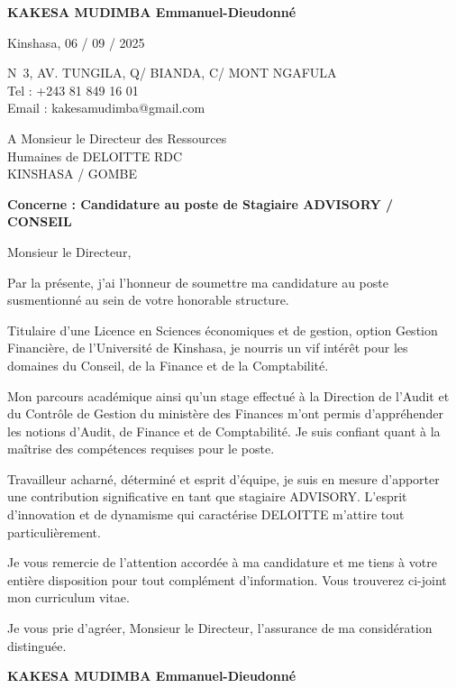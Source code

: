 \documentclass[11pt,a4paper]{article}
\makeatletter
\newcommand{\NomExp}{KAKESA MUDIMBA Emmanuel-Dieudonn\'e}
\newcommand{\AdrExp}{N\textdegree\ 3, AV. TUNGILA, Q/ BIANDA, C/ MONT NGAFULA}
\newcommand{\TelExp}{Tel : +243 81 849 16 01}
\newcommand{\MailExp}{Email : kakesamudimba@gmail.com}
\newcommand{\DateLieu}{Kinshasa, 06 / 09 / 2025}
\newcommand{\DestLigneA}{A Monsieur le Directeur des Ressources}
\newcommand{\DestLigneB}{Humaines de DELOITTE RDC}
\newcommand{\DestLigneC}{KINSHASA / GOMBE}
\newcommand{\Salut}{Monsieur le Directeur,}
\newcommand{\Objet}{Candidature au poste de Stagiaire ADVISORY / CONSEIL}
\newcommand{\Corps}{%
Par la présente, j'ai l'honneur de soumettre ma candidature au poste
susmentionné au sein de votre honorable structure.

Titulaire d'une Licence en Sciences économiques et de gestion, option
Gestion Financière, de l'Université de Kinshasa, je nourris un vif
intérêt pour les domaines du Conseil, de la Finance et de la Comptabilité.

Mon parcours académique ainsi qu'un stage effectué à la Direction de
l'Audit et du Contrôle de Gestion du ministère des Finances m'ont permis
d'appréhender les notions d'Audit, de Finance et de Comptabilité. Je suis
confiant quant à la maîtrise des compétences requises pour le poste.

Travailleur acharné, déterminé et esprit d'équipe, je suis en mesure
d'apporter une contribution significative en tant que stagiaire ADVISORY.
L'esprit d'innovation et de dynamisme qui caractérise DELOITTE m'attire
tout particulièrement.

Je vous remercie de l'attention accordée à ma candidature et me tiens à
votre entière disposition pour tout complément d'information. Vous trouverez
ci-joint mon curriculum vitae.
}
\newcommand{\Formule}{Je vous prie d'agréer, Monsieur le Directeur, l'assurance de ma considération distinguée.}
\makeatother
\begin{document}
\noindent
\begin{minipage}[t]{0.48\textwidth}
  {\color{navy}\textbf{\NomExp}}
\end{minipage}
\hfill
\begin{minipage}[t]{0.48\textwidth}
  \raggedleft
  \DateLieu
\end{minipage}

\noindent
\begin{minipage}[t]{0.48\textwidth}
  \AdrExp\\
  \TelExp\\
  \MailExp
\end{minipage}

\vspace{0.6cm}

\hfill
\begin{minipage}[t]{0.48\textwidth}
  \DestLigneA\\
  \DestLigneB\\
  \DestLigneC
\end{minipage}

\vspace{1.2cm}

{\color{navy}\textbf{Concerne : \Objet}}

\vspace{0.4cm}
\Salut

\vspace{0.3cm}

\Corps

\vspace{0.6cm}
\Formule

\vspace{1.4cm}
\raggedleft
{\color{navy}\textbf{\NomExp}}
\end{document}
